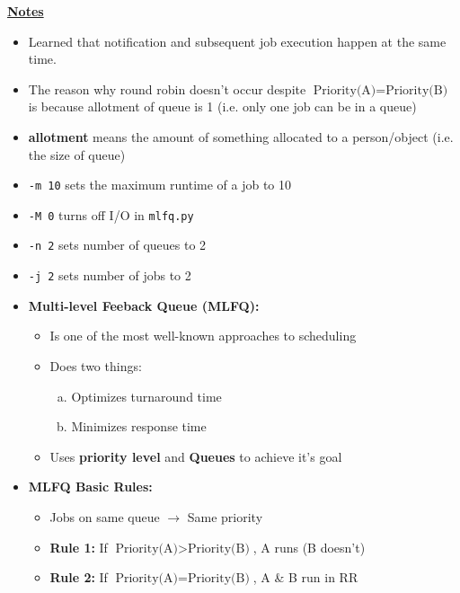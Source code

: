 \documentclass[12pt]{article}
\begin{document}
\begin{enumerate}[1.]
    \bigskip

    \underline{\textbf{Notes}}

    \begin{itemize}
        \item Learned that notification and subsequent job execution happen at the same time.
        \item The reason why round robin doesn't occur despite $\text{Priority(A)} = \text{Priority(B)}$
        is because allotment of queue is 1 (i.e. only one job can be in a queue)
        \item \textbf{allotment} means the amount of something allocated to a person/object (i.e. the size of queue)
        \item \texttt{-m 10} sets the maximum runtime of a job to 10
        \item \texttt{-M 0} turns off I/O in \texttt{mlfq.py}
        \item \texttt{-n 2} sets number of queues to 2
        \item \texttt{-j 2} sets number of jobs to 2

        \item \textbf{Multi-level Feeback Queue (MLFQ):}

        \begin{itemize}
            \item Is one of the most well-known approaches to scheduling
            \item Does two things:

            \begin{enumerate}[a)]
                \item Optimizes turnaround time
                \item Minimizes response time
            \end{enumerate}

            \item Uses \textbf{priority level} and \textbf{Queues} to achieve it's goal
        \end{itemize}

        \item \textbf{MLFQ Basic Rules:}
        \begin{itemize}
            \item Jobs on same queue $\to$ Same priority
            \item \textbf{Rule 1:} If $\text{Priority(A)} > \text{Priority(B)}$, A runs (B doesn't)
            \item \textbf{Rule 2:} If $\text{Priority(A)} = \text{Priority(B)}$, A \& B run in RR
        \end{itemize}


\end{itemize}
\end{enumerate}
\end{document}
